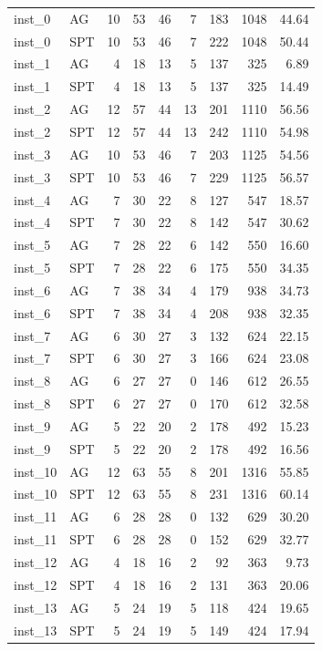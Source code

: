 \begin{longtable}{@{}llrrrrrrr@{}}
inst\_0 & AG & 10 & 53 & 46 & 7 & 183 & 1048 & 44.64 \\
inst\_0 & SPT & 10 & 53 & 46 & 7 & 222 & 1048 & 50.44 \\
inst\_1 & AG & 4 & 18 & 13 & 5 & 137 & 325 & 6.89 \\
inst\_1 & SPT & 4 & 18 & 13 & 5 & 137 & 325 & 14.49 \\
inst\_2 & AG & 12 & 57 & 44 & 13 & 201 & 1110 & 56.56 \\
inst\_2 & SPT & 12 & 57 & 44 & 13 & 242 & 1110 & 54.98 \\
inst\_3 & AG & 10 & 53 & 46 & 7 & 203 & 1125 & 54.56 \\
inst\_3 & SPT & 10 & 53 & 46 & 7 & 229 & 1125 & 56.57 \\
inst\_4 & AG & 7 & 30 & 22 & 8 & 127 & 547 & 18.57 \\
inst\_4 & SPT & 7 & 30 & 22 & 8 & 142 & 547 & 30.62 \\
inst\_5 & AG & 7 & 28 & 22 & 6 & 142 & 550 & 16.60 \\
inst\_5 & SPT & 7 & 28 & 22 & 6 & 175 & 550 & 34.35 \\
inst\_6 & AG & 7 & 38 & 34 & 4 & 179 & 938 & 34.73 \\
inst\_6 & SPT & 7 & 38 & 34 & 4 & 208 & 938 & 32.35 \\
inst\_7 & AG & 6 & 30 & 27 & 3 & 132 & 624 & 22.15 \\
inst\_7 & SPT & 6 & 30 & 27 & 3 & 166 & 624 & 23.08 \\
inst\_8 & AG & 6 & 27 & 27 & 0 & 146 & 612 & 26.55 \\
inst\_8 & SPT & 6 & 27 & 27 & 0 & 170 & 612 & 32.58 \\
inst\_9 & AG & 5 & 22 & 20 & 2 & 178 & 492 & 15.23 \\
inst\_9 & SPT & 5 & 22 & 20 & 2 & 178 & 492 & 16.56 \\
inst\_10 & AG & 12 & 63 & 55 & 8 & 201 & 1316 & 55.85 \\
inst\_10 & SPT & 12 & 63 & 55 & 8 & 231 & 1316 & 60.14 \\
inst\_11 & AG & 6 & 28 & 28 & 0 & 132 & 629 & 30.20 \\
inst\_11 & SPT & 6 & 28 & 28 & 0 & 152 & 629 & 32.77 \\
inst\_12 & AG & 4 & 18 & 16 & 2 & 92 & 363 & 9.73 \\
inst\_12 & SPT & 4 & 18 & 16 & 2 & 131 & 363 & 20.06 \\
inst\_13 & AG & 5 & 24 & 19 & 5 & 118 & 424 & 19.65 \\
inst\_13 & SPT & 5 & 24 & 19 & 5 & 149 & 424 & 17.94 \\

\end{longtable}
